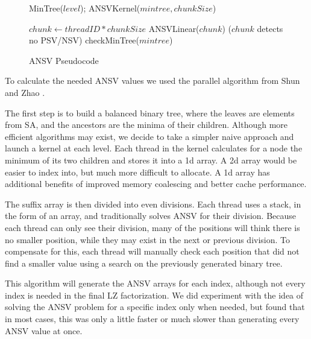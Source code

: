 \begin{figure}
\begin{algorithmic}[1]
\State MinTree($level$);
\EndFor
\State ANSVKernel($mintree,chunkSize$)
\EndProcedure
\end{algorithmic}
\begin{algorithmic}[1]
\State $chunk \gets threadID * chunkSize$
\State ANSVLinear($chunk$)
\If($chunk$ detects no PSV/NSV)
\State checkMinTree($mintree$)
\EndIf
\EndProcedure
\end{algorithmic}
\caption{ANSV Pseudocode}
\label{algorithm:ansv}
\end{figure}

To calculate the needed ANSV values we used the parallel algorithm from Shun and Zhao \cite{shun2013practical}.

The first step is to build a balanced binary tree, where the leaves are elements from SA, and the ancestors are the minima of their children.
Although more efficient algorithms may exist, we decide to take a simpler naive approach and launch a kernel at each level.
Each thread in the kernel calculates for a node the minimum of its two children and stores it into a 1d array.
A 2d array would be easier to index into, but much more difficult to allocate.
A 1d array has additional benefits of improved memory coalescing and better cache performance.

The suffix array is then divided into even divisions.
Each thread uses a stack, in the form of an array, and traditionally solves ANSV for their division.
Because each thread can only see their division, many of the positions will think there is no smaller position, while they may exist in the next or previous division.
To compensate for this, each thread will manually check each position that did not find a smaller value using a search on the previously generated binary tree.

This algorithm will generate the ANSV arrays for each index, although not every index is needed in the final LZ factorization. 
We did experiment with the idea of solving the ANSV problem for a specific index only when needed, but found that in most cases, this was only a little faster or much slower than generating every ANSV value at once.

